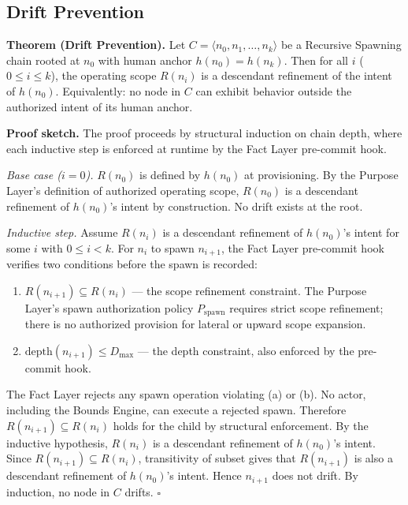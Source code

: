\subsection{Drift Prevention}
\label{sec:rs-drift-prevention}

\medskip
\noindent\textbf{Theorem (Drift Prevention).} Let $C = \langle n_0, n_1, \ldots, n_k \rangle$ be a Recursive Spawning chain rooted at $n_0$ with human anchor $h(n_0) = h(n_k)$. Then for all $i$ ($0 \leq i \leq k$), the operating scope $R(n_i)$ is a descendant refinement of the intent of $h(n_0)$. Equivalently: no node in $C$ can exhibit behavior outside the authorized intent of its human anchor.

\medskip
\noindent\textbf{Proof sketch.} The proof proceeds by structural induction on chain depth, where each inductive step is enforced at runtime by the Fact Layer pre-commit hook.

\medskip
\textit{Base case ($i=0$).} $R(n_0)$ is defined by $h(n_0)$ at provisioning. By the Purpose Layer's definition of authorized operating scope, $R(n_0)$ is a descendant refinement of $h(n_0)$'s intent by construction. No drift exists at the root.

\medskip
\textit{Inductive step.} Assume $R(n_i)$ is a descendant refinement of $h(n_0)$'s intent for some $i$ with $0 \leq i < k$. For $n_i$ to spawn $n_{i+1}$, the Fact Layer pre-commit hook verifies two conditions before the spawn is recorded:

\begin{enumerate}
    \item[(a)] $R(n_{i+1}) \subseteq R(n_i)$ --- the scope refinement constraint. The Purpose Layer's spawn authorization policy $P_{\mathrm{spawn}}$ requires strict scope refinement; there is no authorized provision for lateral or upward scope expansion.
    \item[(b)] $\mathrm{depth}(n_{i+1}) \leq D_{\mathrm{max}}$ --- the depth constraint, also enforced by the pre-commit hook.
\end{enumerate}

The Fact Layer rejects any spawn operation violating (a) or (b). No actor, including the Bounds Engine, can execute a rejected spawn. Therefore $R(n_{i+1}) \subseteq R(n_i)$ holds for the child by structural enforcement. By the inductive hypothesis, $R(n_i)$ is a descendant refinement of $h(n_0)$'s intent. Since $R(n_{i+1}) \subseteq R(n_i)$, transitivity of subset gives that $R(n_{i+1})$ is also a descendant refinement of $h(n_0)$'s intent. Hence $n_{i+1}$ does not drift. By induction, no node in $C$ drifts. $\square$


